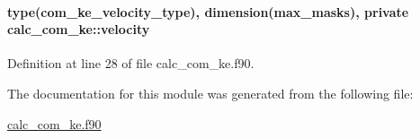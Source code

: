 \hypertarget{classcalc__com__ke_a23f9559a29dfbfe86caa7f7b1c64fca3}{
\paragraph[{velocity}]{\setlength{\rightskip}{0pt plus 5cm}type({\bf com\-\_\-ke\-\_\-velocity\-\_\-type}), dimension({\bf max\-\_\-masks}), private calc\-\_\-com\-\_\-ke\-::velocity\hspace{0.3cm}{\ttfamily [private]}}}\label{classcalc__com__ke_a23f9559a29dfbfe86caa7f7b1c64fca3}


Definition at line 28 of file calc\-\_\-com\-\_\-ke.\-f90.



The documentation for this module was generated from the following file\-:\begin{DoxyCompactItemize}
\item 
\hyperlink{calc__com__ke_8f90}{calc\-\_\-com\-\_\-ke.\-f90}\end{DoxyCompactItemize}
